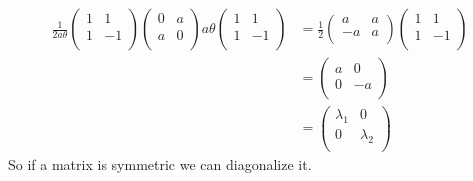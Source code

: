 \begin{equation}
\begin{split}
\frac{1}{2a \theta }
\begin{pmatrix}
1 & 1\\
1 & -1\\ 
\end{pmatrix}
\begin{pmatrix}
0 & a\\
a & 0\\
\end{pmatrix}
a\theta
\begin{pmatrix}
1 & 1\\
1 & -1\\ 
\end{pmatrix} &=
\frac{1}{2}
\begin{pmatrix}
a & a\\
-a & a \\
\end{pmatrix}
\begin{pmatrix}
1 & 1\\
1 & -1\\ 
\end{pmatrix}\\
&= \begin{pmatrix}
a & 0\\
0 & -a\\
\end{pmatrix}\\
&= \begin{pmatrix}
\lambda_1 & 0 \\
0 & \lambda_2 \\
\end{pmatrix}
\end{split}
\end{equation}
So if a matrix is symmetric we can diagonalize it.
